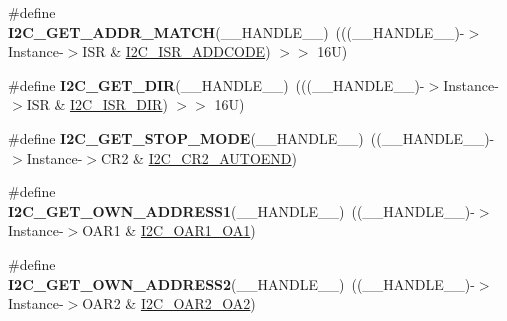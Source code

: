 \begin{DoxyCompactItemize}
\item 
\mbox{\label{group___i2_c___private___macro_ga30d76b55c39e04efb077f47eb454261d}} 
\#define {\bfseries I2\+C\+\_\+\+G\+E\+T\+\_\+\+A\+D\+D\+R\+\_\+\+M\+A\+T\+CH}(\+\_\+\+\_\+\+H\+A\+N\+D\+L\+E\+\_\+\+\_\+)~(((\+\_\+\+\_\+\+H\+A\+N\+D\+L\+E\+\_\+\+\_\+)-\/$>$Instance-\/$>$I\+SR \& \hyperlink{group___peripheral___registers___bits___definition_ga9050a7e2c1d8777251352f51197e4c80}{I2\+C\+\_\+\+I\+S\+R\+\_\+\+A\+D\+D\+C\+O\+DE}) $>$$>$ 16\+U)
\item 
\mbox{\label{group___i2_c___private___macro_ga0359d435a6d984b3fefdc2da709e5764}} 
\#define {\bfseries I2\+C\+\_\+\+G\+E\+T\+\_\+\+D\+IR}(\+\_\+\+\_\+\+H\+A\+N\+D\+L\+E\+\_\+\+\_\+)~(((\+\_\+\+\_\+\+H\+A\+N\+D\+L\+E\+\_\+\+\_\+)-\/$>$Instance-\/$>$I\+SR \& \hyperlink{group___peripheral___registers___bits___definition_gaa4890d7deb94106f946b28a7309e22aa}{I2\+C\+\_\+\+I\+S\+R\+\_\+\+D\+IR}) $>$$>$ 16\+U)
\item 
\mbox{\label{group___i2_c___private___macro_ga1bc559a860da12ee5a7517548facbc57}} 
\#define {\bfseries I2\+C\+\_\+\+G\+E\+T\+\_\+\+S\+T\+O\+P\+\_\+\+M\+O\+DE}(\+\_\+\+\_\+\+H\+A\+N\+D\+L\+E\+\_\+\+\_\+)~((\+\_\+\+\_\+\+H\+A\+N\+D\+L\+E\+\_\+\+\_\+)-\/$>$Instance-\/$>$C\+R2 \& \hyperlink{group___peripheral___registers___bits___definition_gabcf789c74e217ec8967bcabc156a6c54}{I2\+C\+\_\+\+C\+R2\+\_\+\+A\+U\+T\+O\+E\+ND})
\item 
\mbox{\label{group___i2_c___private___macro_gaa80106d084f4027f8f341f2c3c49dcfa}} 
\#define {\bfseries I2\+C\+\_\+\+G\+E\+T\+\_\+\+O\+W\+N\+\_\+\+A\+D\+D\+R\+E\+S\+S1}(\+\_\+\+\_\+\+H\+A\+N\+D\+L\+E\+\_\+\+\_\+)~((\+\_\+\+\_\+\+H\+A\+N\+D\+L\+E\+\_\+\+\_\+)-\/$>$Instance-\/$>$O\+A\+R1 \& \hyperlink{group___peripheral___registers___bits___definition_gabb954a9a0e3e3898574643b6d725a70f}{I2\+C\+\_\+\+O\+A\+R1\+\_\+\+O\+A1})
\item 
\mbox{\label{group___i2_c___private___macro_gad0b113e974debf6a9af783e1fe08ef23}} 
\#define {\bfseries I2\+C\+\_\+\+G\+E\+T\+\_\+\+O\+W\+N\+\_\+\+A\+D\+D\+R\+E\+S\+S2}(\+\_\+\+\_\+\+H\+A\+N\+D\+L\+E\+\_\+\+\_\+)~((\+\_\+\+\_\+\+H\+A\+N\+D\+L\+E\+\_\+\+\_\+)-\/$>$Instance-\/$>$O\+A\+R2 \& \hyperlink{group___peripheral___registers___bits___definition_ga4627c5a89a3cbe9546321418f8cb9da2}{I2\+C\+\_\+\+O\+A\+R2\+\_\+\+O\+A2})

\end{DoxyCompactItemize}
